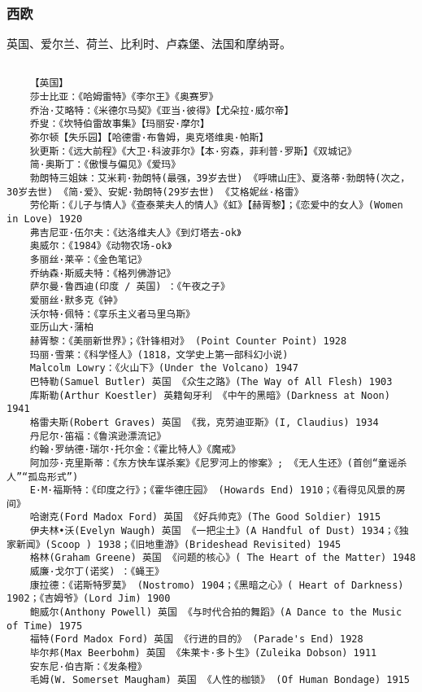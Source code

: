 \documentclass[UTF8]{../../RepresentationUniverse}
\begin{document}
\subsubsection{西欧}
英国、爱尔兰、荷兰、比利时、卢森堡、法国和摩纳哥。
\begin{lstlisting}

    【英国】
    莎士比亚：《哈姆雷特》《李尔王》《奥赛罗》
    乔治·艾略特：《米德尔马契》《亚当·彼得》【尤朵拉·威尔帝】
    乔叟：《坎特伯雷故事集》【玛丽安·摩尔】
    弥尔顿【失乐园】【哈德雷·布鲁姆，奥克塔维奥·帕斯】
    狄更斯：《远大前程》《大卫·科波菲尔》【本·穷森，菲利普·罗斯】《双城记》
    简·奥斯丁：《傲慢与偏见》《爱玛》
    勃朗特三姐妹：艾米莉·勃朗特(最强，39岁去世) 《呼啸山庄》、夏洛蒂·勃朗特(次之，30岁去世) 《简·爱》、安妮·勃朗特(29岁去世) 《艾格妮丝·格雷》
    劳伦斯：《儿子与情人》《查泰莱夫人的情人》《虹》【赫胥黎】；《恋爱中的女人》(Women in Love) 1920
    弗吉尼亚·伍尔夫：《达洛维夫人》《到灯塔去-ok》
    奥威尔：《1984》《动物农场-ok》
    多丽丝·莱辛：《金色笔记》
    乔纳森·斯威夫特：《格列佛游记》
    萨尔曼·鲁西迪(印度 / 英国) ：《午夜之子》
    爱丽丝·默多克《钟》
    沃尔特·佩特：《享乐主义者马里乌斯》
    亚历山大·蒲柏
    赫胥黎：《美丽新世界》；《针锋相对》 (Point Counter Point) 1928
    玛丽·雪莱：《科学怪人》(1818，文学史上第一部科幻小说) 
    Malcolm Lowry：《火山下》(Under the Volcano) 1947
    巴特勒(Samuel Butler) 英国 《众生之路》(The Way of All Flesh) 1903
    库斯勒(Arthur Koestler) 英籍匈牙利 《中午的黑暗》(Darkness at Noon) 1941
    格雷夫斯(Robert Graves) 英国 《我，克劳迪亚斯》(I, Claudius) 1934
    丹尼尔·笛福：《鲁滨逊漂流记》
    约翰·罗纳德·瑞尔·托尔金：《霍比特人》《魔戒》
    阿加莎·克里斯蒂：《东方快车谋杀案》《尼罗河上的惨案》; 《无人生还》(首创“童谣杀人”“孤岛形式”)
    E·M·福斯特：《印度之行》；《霍华德庄园》 (Howards End) 1910；《看得见风景的房间》
    哈谢克(Ford Madox Ford) 英国 《好兵帅克》(The Good Soldier) 1915
    伊夫林•沃(Evelyn Waugh) 英国 《一把尘土》(A Handful of Dust) 1934；《独家新闻》(Scoop ) 1938；《旧地重游》(Brideshead Revisited) 1945
    格林(Graham Greene) 英国 《问题的核心》( The Heart of the Matter) 1948
    威廉·戈尔丁(诺奖) ：《蝇王》
    康拉德：《诺斯特罗莫》 (Nostromo) 1904；《黑暗之心》( Heart of Darkness) 1902；《吉姆爷》(Lord Jim) 1900
    鲍威尔(Anthony Powell) 英国 《与时代合拍的舞蹈》(A Dance to the Music of Time) 1975
    福特(Ford Madox Ford) 英国 《行进的目的》 (Parade's End) 1928
    毕尔邦(Max Beerbohm) 英国 《朱莱卡·多卜生》(Zuleika Dobson) 1911
    安东尼·伯吉斯：《发条橙》
    毛姆(W. Somerset Maugham) 英国 《人性的枷锁》 (Of Human Bondage) 1915

\end{lstlisting}
\end{document}
